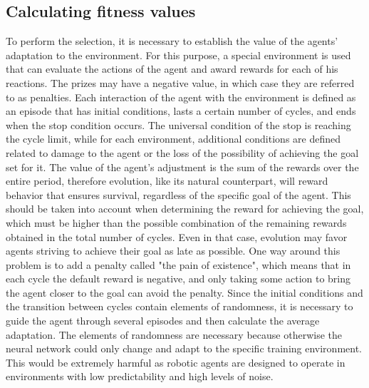 \subsection{Calculating fitness values}
To perform the selection, it is necessary to establish the value of the agents' adaptation to 
the environment. 
For this purpose, a special environment is used that can evaluate the actions of the agent 
and award rewards for each of his reactions. 
The prizes may have a negative value, in which case they are referred to as penalties.
Each interaction of the agent with the environment is defined as an episode that has initial 
conditions, lasts a certain number of cycles, and ends when the stop condition occurs.
The universal condition of the stop is reaching the cycle limit, while for each environment, 
additional conditions are defined related to damage to the agent or the loss of the possibility 
of achieving the goal set for it.
The value of the agent's adjustment is the sum of the rewards over the entire period, 
therefore evolution, like its natural counterpart, will reward behavior that ensures survival, 
regardless of the specific goal of the agent.
This should be taken into account when determining the reward for achieving the goal, which must 
be higher than the possible combination of the remaining rewards obtained in the total number of 
cycles.
Even in that case, evolution may favor agents striving to achieve their goal as late as possible. 
One way around this problem is to add a penalty called "the pain of existence", which means that 
in each cycle the default reward is negative, and only taking some action to bring the agent 
closer to the goal can avoid the penalty.
Since the initial conditions and the transition between cycles contain elements of randomness, 
it is necessary to guide the agent through several episodes and then calculate the average adaptation. 
The elements of randomness are necessary because otherwise the neural network could only change 
and adapt to the specific training environment.
This would be extremely harmful as robotic agents are designed to operate in environments with 
low predictability and high levels of noise.

\FloatBarrier
